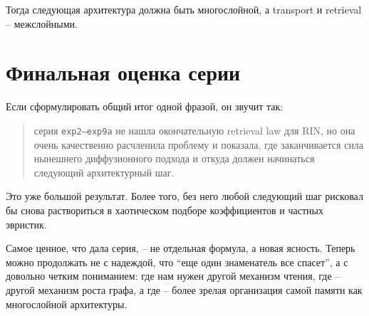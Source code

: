 Тогда следующая архитектура должна быть многослойной, а transport и retrieval --
межслойными.

\section{Финальная оценка серии}

Если сформулировать общий итог одной фразой, он звучит так:

\begin{quote}
серия \texttt{exp2--exp9a} не нашла окончательную retrieval law для RIN, но она
очень качественно расчленила проблему и показала, где заканчивается сила
нынешнего диффузионного подхода и откуда должен начинаться следующий архитектурный
шаг.
\end{quote}

Это уже большой результат. Более того, без него любой следующий шаг рисковал бы
снова раствориться в хаотическом подборе коэффициентов и частных эвристик.

\begin{takeaway}
Самое ценное, что дала серия, -- не отдельная формула, а новая ясность. Теперь
можно продолжать не с надеждой, что ``еще один знаменатель все спасет'', а с
довольно четким пониманием: где нам нужен другой механизм чтения, где -- другой
механизм роста графа, а где -- более зрелая организация самой памяти как
многослойной архитектуры.
\end{takeaway}
